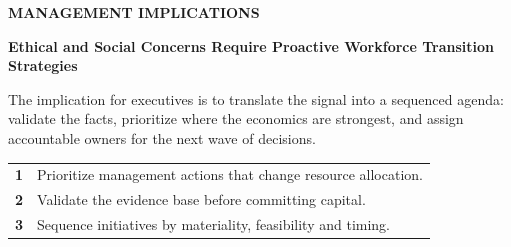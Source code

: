 \documentclass[10pt,a4paper]{article}
\begin{document}
\vspace{6pt}{\textcolor{BOBlue}{\scriptsize\bfseries STRATEGIC POSITIONING MAP}}\par
\begin{center}
\end{center}

\clearpage
{\textcolor{BOBlue}{\scriptsize\bfseries MANAGEMENT IMPLICATIONS}}\par\vspace{-1pt}
{\Large\sffamily\bfseries\color{BONavy} Ethical and Social Concerns Require Proactive Workforce Transition Strategies}\par\vspace{4pt}
{\small The implication for executives is to translate the signal into a sequenced agenda: validate the facts, prioritize where the economics are strongest, and assign accountable owners for the next wave of decisions.}\par
\begin{tabularx}{\linewidth}{p{10mm}Y}
\textcolor{BOBlue}{\bfseries 1} & Prioritize management actions that change resource allocation. \\[5pt]
\textcolor{BOBlue}{\bfseries 2} & Validate the evidence base before committing capital. \\[5pt]
\textcolor{BOBlue}{\bfseries 3} & Sequence initiatives by materiality, feasibility and timing. \\[5pt]
\end{tabularx}
\vspace{6pt}
\end{document}
